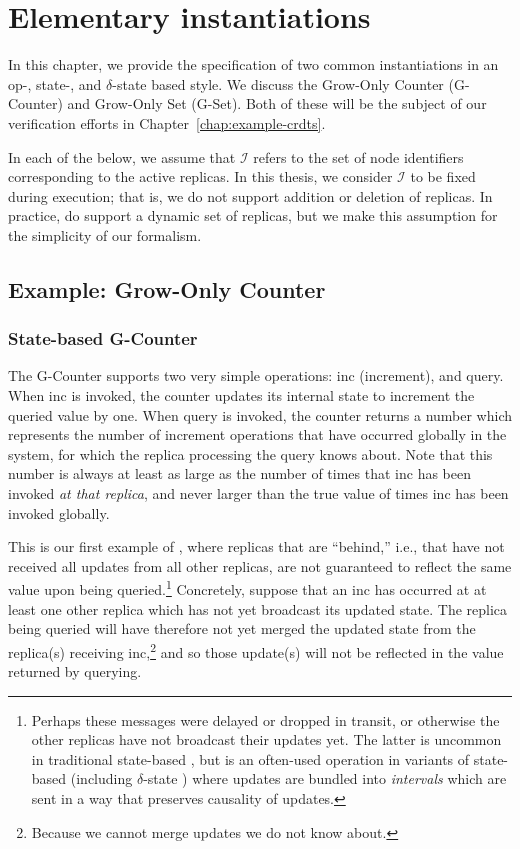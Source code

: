 \chapter{Elementary \CRDT instantiations}
\label{chap:crdt-instantiations}

In this chapter, we provide the specification of two common \CRDT instantiations
in an op-, state-, and $\delta$-state based style. We discuss the Grow-Only
Counter (G-Counter) and Grow-Only Set (G-Set). Both of these will be the subject
of our verification efforts in Chapter~\ref{chap:example-crdts}.

In each of the below, we assume that $\mathcal{I}$ refers to the set of node
identifiers corresponding to the active replicas. In this thesis, we
consider $\mathcal{I}$ to be fixed during execution; that is, we do not support
addition or deletion of replicas. In practice, \CRDTs do support a dynamic set
of replicas, but we make this assumption for the simplicity of our formalism.

\section{Example: Grow-Only Counter}
\label{sec:example-gcounter}

\subsection{State-based G-Counter}
The G-Counter supports two very simple operations: \textsf{inc} (increment), and
query. When \textsf{inc} is invoked, the counter updates its internal state to
increment the queried value by one. When query is invoked, the counter returns a
number which represents the number of increment operations that have occurred
globally in the system, for which the replica processing the query knows about.
Note that this number is always at least as large as the number of times that
\textsf{inc} has been invoked \textit{at that replica}, and never larger than
the true value of times \textsf{inc} has been invoked globally.

This is our first example of \SEC, where replicas that are ``behind,'' i.e.,
that have not received all updates from all other replicas, are not guaranteed
to reflect the same value upon being queried.\footnote{Perhaps these messages
were delayed or dropped in transit, or otherwise the other replicas have not
broadcast their updates yet. The latter is uncommon in traditional state-based
\CRDTs, but is an often-used operation in variants of state-based \CRDTs
(including $\delta$-state \CRDTs) where updates are bundled into
\emph{intervals} which are sent in a way that preserves causality of updates.}
Concretely, suppose that an \textsf{inc} has occurred at at least one other
replica which has not yet broadcast its updated state. The replica being queried
will have therefore not yet merged the updated state from the replica(s)
receiving \textsf{inc},\footnote{Because we cannot merge updates we do not know
about.} and so those update(s) will not be reflected in the value returned by
querying.

